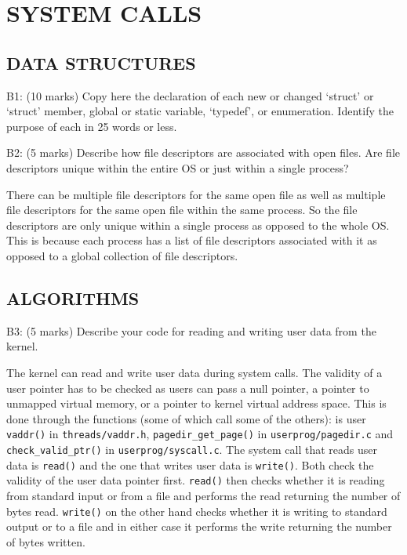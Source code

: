 \section{SYSTEM CALLS}

\subsection*{DATA STRUCTURES}

\noindent B1: (10 marks)
Copy here the declaration of each new or changed `struct' or
`struct' member, global or static variable, `typedef', or
enumeration.  Identify the purpose of each in 25 words or less.




\noindent B2: (5 marks)
Describe how file descriptors are associated with open files.
Are file descriptors unique within the entire OS or just within a
single process?


There can be multiple file descriptors for the same open file as well as multiple file descriptors for the same open file within the same process. So the file descriptors are only unique within a single process as opposed to the whole OS. This is because each process has a list of file descriptors associated with it as opposed to a global collection of file descriptors.


\subsection*{ALGORITHMS}

\noindent B3: (5 marks)
Describe your code for reading and writing user data from the
kernel.


The kernel can read and write user data during system calls. The validity of a user pointer has to be checked as users can pass a null pointer, a pointer to unmapped virtual memory, or a pointer to kernel virtual address space. This is done through the functions (some of which call some of the others): is user \texttt{vaddr()} in \texttt{threads/vaddr.h}, \texttt{pagedir\_get\_page()} in \texttt{userprog/pagedir.c} and \texttt{check\_valid\_ptr()} in \texttt{userprog/syscall.c}. The system call that reads user data is \texttt{read()} and the one that writes user data is \texttt{write()}. Both check the validity of the user data pointer first. \texttt{read()} then checks whether it is reading from standard input or from a file and performs the read returning the number of bytes read. \texttt{write()} on the other hand checks whether it is writing to standard output or to a file and in either case it performs the write returning the number of bytes written.

